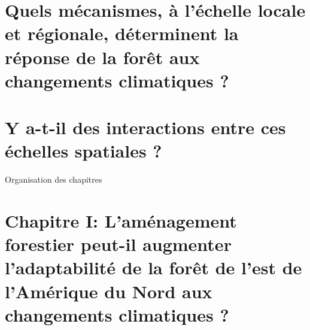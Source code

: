 \documentclass[11pt, compress, aspectratio=1610]{beamer}
\begin{document}
\section{\texorpdfstring{Quels mécanismes, à l'échelle locale et
régionale, déterminent la réponse de la forêt aux changements
\newline climatiques
?}{Quels mécanismes, à l'échelle locale et régionale, déterminent la réponse de la forêt aux changements climatiques ?}}\label{quels-muxe9canismes-uxe0-luxe9chelle-locale-et-ruxe9gionale-duxe9terminent-la-ruxe9ponse-de-la-foruxeat-aux-changements-climatiques}

\section{Y a-t-il des interactions entre ces échelles spatiales
?}\label{y-a-t-il-des-interactions-entre-ces-uxe9chelles-spatiales}

\begin{frame}{Organisation des chapitres}



\end{frame}

\section{\texorpdfstring{Chapitre I: \newline L'aménagement forestier
peut-il \newline augmenter l'adaptabilité de la forêt de l'est de
l'Amérique du Nord aux changements climatiques
?}{Chapitre I: L'aménagement forestier peut-il augmenter l'adaptabilité de la forêt de l'est de l'Amérique du Nord aux changements climatiques ?}}\label{chapitre-i-lamuxe9nagement-forestier-peut-il-augmenter-ladaptabilituxe9-de-la-foruxeat-de-lest-de-lamuxe9rique-du-nord-aux-changements-climatiques}
\end{document}
